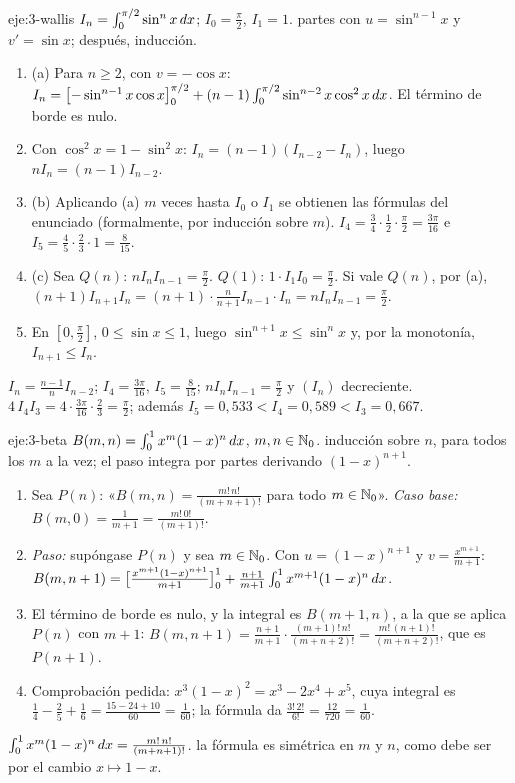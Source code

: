 \begin{solucion}{eje:3-wallis}
\datos $I_n=\int_0^{\pi/2}\sin^{n}x\mathop{}\!d x$; $I_0=\frac\pi2$, $I_1=1$.
\planteamiento partes con $u=\sin^{n-1}x$ y $v'=\sin x$; después, inducción.
\pasos
\begin{enumerate}[label=\arabic*.]
  \item (a) Para $n\ge2$, con $v=-\cos x$: $I_n=\bigl[-\sin^{n-1}x\cos x\bigr]_{0}^{\pi/2}+(n-1)\int_0^{\pi/2}\sin^{n-2}x\cos^{2}x\mathop{}\!d x$. El término de borde es nulo.
  \item Con $\cos^{2}x=1-\sin^{2}x$: $I_n=(n-1)(I_{n-2}-I_n)$, luego $nI_n=(n-1)I_{n-2}$.
  \item (b) Aplicando (a) $m$ veces hasta $I_0$ o $I_1$ se obtienen las fórmulas del enunciado (formalmente, por inducción sobre $m$). $I_4=\frac34\cdot\frac12\cdot\frac\pi2=\frac{3\pi}{16}$ e $I_5=\frac45\cdot\frac23\cdot1=\frac{8}{15}$.
  \item (c) Sea $Q(n)$: $nI_nI_{n-1}=\frac\pi2$. $Q(1)$: $1\cdot I_1I_0=\frac\pi2$. Si vale $Q(n)$, por (a), $(n+1)I_{n+1}I_n=(n+1)\cdot\frac{n}{n+1}I_{n-1}\cdot I_n=nI_nI_{n-1}=\frac\pi2$.
  \item En $[0,\frac\pi2]$, $0\le\sin x\le1$, luego $\sin^{n+1}x\le\sin^{n}x$ y, por la monotonía, $I_{n+1}\le I_n$.
\end{enumerate}
\resultado $I_n=\frac{n-1}{n}I_{n-2}$; $I_4=\frac{3\pi}{16}$, $I_5=\frac{8}{15}$; $nI_nI_{n-1}=\frac\pi2$ y $(I_n)$ decreciente.
\comprobacion $4\,I_4I_3=4\cdot\frac{3\pi}{16}\cdot\frac23=\frac\pi2$; además $I_5=0{,}533<I_4=0{,}589<I_3=0{,}667$.
\end{solucion}

\begin{solucion}{eje:3-beta}
\datos $B(m,n)=\int_0^{1}x^{m}(1-x)^{n}\mathop{}\!d x$, $m,n\in\mathbb{N}_0$.
\planteamiento inducción sobre $n$, para todos los $m$ a la vez; el paso integra por partes derivando $(1-x)^{n+1}$.
\pasos
\begin{enumerate}[label=\arabic*.]
  \item Sea $P(n)$: «$B(m,n)=\frac{m!\,n!}{(m+n+1)!}$ para todo $m\in\mathbb{N}_0$». \emph{Caso base:} $B(m,0)=\frac{1}{m+1}=\frac{m!\,0!}{(m+1)!}$.
  \item \emph{Paso:} supóngase $P(n)$ y sea $m\in\mathbb{N}_0$. Con $u=(1-x)^{n+1}$ y $v=\frac{x^{m+1}}{m+1}$:
  $B(m,n+1)=\bigl[\frac{x^{m+1}(1-x)^{n+1}}{m+1}\bigr]_{0}^{1}+\frac{n+1}{m+1}\int_0^{1}x^{m+1}(1-x)^{n}\mathop{}\!d x$.
  \item El término de borde es nulo, y la integral es $B(m+1,n)$, a la que se aplica $P(n)$ con $m+1$:
  $B(m,n+1)=\frac{n+1}{m+1}\cdot\frac{(m+1)!\,n!}{(m+n+2)!}=\frac{m!\,(n+1)!}{(m+n+2)!}$, que es $P(n+1)$.
  \item Comprobación pedida: $x^{3}(1-x)^{2}=x^{3}-2x^{4}+x^{5}$, cuya integral es $\frac14-\frac25+\frac16=\frac{15-24+10}{60}=\frac{1}{60}$; la fórmula da $\frac{3!\,2!}{6!}=\frac{12}{720}=\frac{1}{60}$.
\end{enumerate}
\resultado $\int_0^{1}x^{m}(1-x)^{n}\mathop{}\!d x=\frac{m!\,n!}{(m+n+1)!}$.
\comprobacion la fórmula es simétrica en $m$ y $n$, como debe ser por el cambio $x\mapsto1-x$.
\end{solucion}

